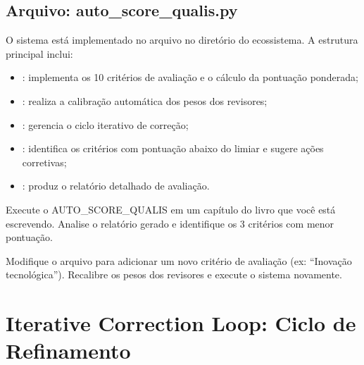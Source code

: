 \subsection{Arquivo: auto\_score\_qualis.py}

O sistema está implementado no arquivo  no
diretório  do ecossistema. A estrutura principal
inclui:

\begin{itemize}
\item {}: implementa os 10 critérios
      de avaliação e o cálculo da pontuação ponderada;
\item {}: realiza a calibração
      automática dos pesos dos revisores;
\item {}: gerencia o ciclo
      iterativo de correção;
\item {}: identifica os critérios com
      pontuação abaixo do limiar e sugere ações corretivas;
\item {}: produz o relatório
      detalhado de avaliação.
\end{itemize}

\begin{exercicio}
    Execute o AUTO\_SCORE\_QUALIS em um capítulo do livro que você está
    escrevendo. Analise o relatório gerado e identifique os 3 critérios
    com menor pontuação.
\end{exercicio}

\begin{exercicio}
    Modifique o arquivo  para adicionar um
    novo critério de avaliação (ex: ``Inovação tecnológica''). Recalibre
    os pesos dos revisores e execute o sistema novamente.
\end{exercicio}

\section{Iterative Correction Loop: Ciclo de Refinamento}
\label{sec:iterative-correction-loop}
\nivelavancado

